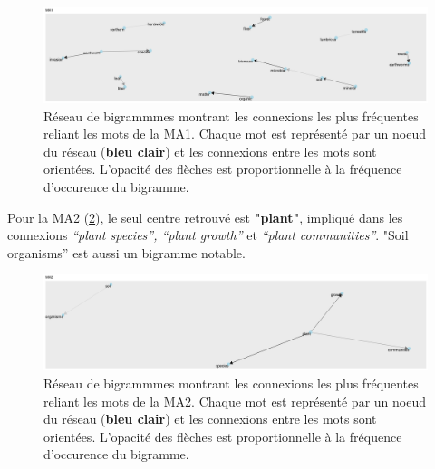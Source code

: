 \documentclass{book}
\begin{document}
\begin{figure}[htb] %
    \begin{center} %
        \includegraphics[width=1\textwidth]{network1.png}
        \caption[Réseau de bigrammmes orienté montrant les connexions les plus fréquentes reliant les mots de la MA1.]{Réseau de bigrammmes montrant les connexions les plus fréquentes reliant les mots de la MA1. Chaque mot est représenté par un noeud du réseau (\textbf{bleu clair}) et les connexions entre les mots sont orientées. L'opacité des flèches est proportionnelle à la fréquence d'occurence du bigramme.\label{network1}}
    \end{center}  
\end{figure}

Pour la MA2 (\cref{network2}), le seul centre retrouvé est \textbf{"plant"}, impliqué dans les connexions \textit{“plant species”, “plant growth”} et \textit{ “plant communities”}. "Soil organisms” est aussi un bigramme notable.

\begin{figure}[htb] %
    \begin{center} %
        \includegraphics[width=1\textwidth]{network2.png}
        \caption[Réseau de bigrammmes orienté montrant les connexions les plus fréquentes reliant les mots de la MA2.]{Réseau de bigrammmes montrant les connexions les plus fréquentes reliant les mots de la MA2. Chaque mot est représenté par un noeud du réseau (\textbf{bleu clair}) et les connexions entre les mots sont orientées. L'opacité des flèches est proportionnelle à la fréquence d'occurence du bigramme.\label{network2}}
    \end{center}  
\end{figure}
\end{document}
